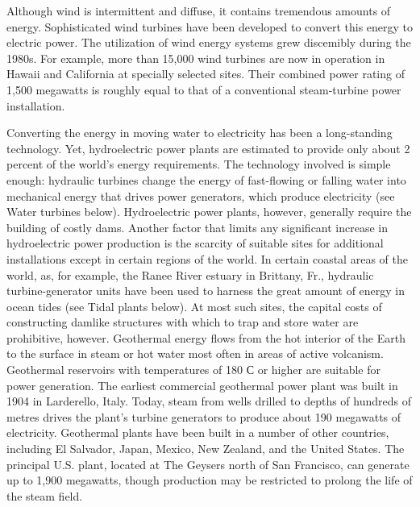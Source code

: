 \documentclass[a4paper]{article}
\begin{document}
Although wind is intermittent and diffuse, it contains tremendous amounts of energy. Sophisticated
wind turbines have been developed to convert this energy to electric power. The utilization
of wind energy systems grew discemibly during the 1980s. For example, more than 15,000 wind
turbines are now in operation in Hawaii and California at specially selected sites. Their
combined power rating of 1,500 megawatts is roughly equal to that of a conventional
steam-turbine power installation.

Converting the energy in moving water to electricity has been a long-standing technology.
Yet, hydroelectric power plants are estimated to provide only about 2 percent of the world's
energy requirements. The technology involved is simple enough: hydraulic turbines change the
energy of fast-flowing or falling water into mechanical energy that drives power generators,
which produce electricity (see Water turbines below). Hydroelectric power plants, however,
generally require the building of costly dams. Another factor that limits any significant
increase in hydroelectric power production is the scarcity of suitable sites for additional
installations except in certain regions of the world. In certain coastal areas of the world,
as, for example, the Ranee River estuary in Brittany, Fr., hydraulic turbine-generator units
have been used to harness the great amount of energy in ocean tides (see Tidal plants below).
At most such sites, the capital costs of constructing damlike structures with which to trap and
store water are prohibitive, however. Geothermal energy flows from the hot interior of the Earth
to the surface in steam or hot water most often in areas of active volcanism. Geothermal
reservoirs with temperatures of 180 С or higher are suitable for power generation. The earliest
commercial geothermal power plant was built in 1904 in Larderello, Italy. Today, steam from wells
drilled to depths of hundreds of metres drives the plant's turbine generators to produce about
190 megawatts of electricity. Geothermal plants have been built in a number of other countries,
including El Salvador, Japan, Mexico, New Zealand, and the United States. The principal
U.S. plant, located at The Geysers north of San Francisco, can generate up to 1,900 megawatts,
though production may be restricted to prolong the life of the steam field.
\end{document}
